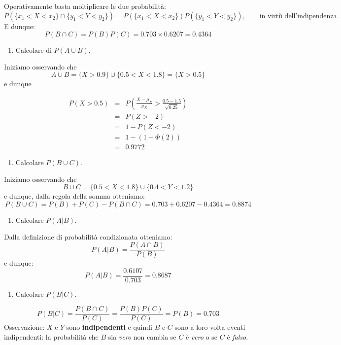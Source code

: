 \documentclass[
  11pt,
]{book}
\providecommand{\tightlist}{%
  \setlength{\itemsep}{0pt}\setlength{\parskip}{0pt}}
\theoremstyle{mytheoremstyle}
\theoremstyle{mydefstyle}
\begin{document}
Operativamente basta moltiplicare le due probabilità:
\[P(\{x_1<X<x_2\}\cap\{y_1<Y<y_2\})=P(\{x_1<X<x_2\})P(\{y_1<Y<y_2\}),\qquad \text{in virtù dell'indipendenza}\]
E dunque:
\[P(B\cap C)=P(B)P(C)=0.703\times0.6207=0.4364\]

\begin{enumerate}
\def\labelenumi{\arabic{enumi}.}
\setcounter{enumi}{7}
\tightlist
\item
  Calcolare di \(P(A\cup B)\).
\end{enumerate}

Iniziamo osservando che
\[A\cup B=\{X>0.9\}\cup\{0.5<X<1.8\}=\{X > 0.5\}\]
e dunque

\begin{eqnarray*}
      P( X   >   0.5 ) 
        &=& P\left(  \frac { X  -  \mu_X }{ \sigma_X }  >  \frac { 0.5  -  1.5 }{\sqrt{ 0.25 }} \right)  \\
                 &=& P\left(  Z   >   -2 \right) \\    &=& 1-P(Z< -2 )\\ 
                 &=&  1-(1-\Phi( 2 )) \\ &=&  0.9772 
      \end{eqnarray*}

\begin{enumerate}
\def\labelenumi{\arabic{enumi}.}
\setcounter{enumi}{8}
\tightlist
\item
  Calcolare \(P(B\cup C)\).
\end{enumerate}

Iniziamo osservando che
\[B\cup C=\{0.5<X<1.8\}\cup\{0.4<Y<1.2\}\]
e dunque, dalla regola della somma otteniamo:
\[P(B\cup C)=P(B)+P(C)-P(B\cap C)=0.703+0.6207-0.4364=0.8874\]

\begin{enumerate}
\def\labelenumi{\arabic{enumi}.}
\setcounter{enumi}{9}
\tightlist
\item
  Calcolare \(P(A|B)\).
\end{enumerate}

Dalla definizione di probabilità condizionata otteniamo:
\[P(A|B)=\frac{P(A\cap B)}{P(B)}\]
e dunque:
\[P(A|B)=\frac{0.6107}{0.703}=0.8687\]

\begin{enumerate}
\def\labelenumi{\arabic{enumi}.}
\setcounter{enumi}{10}
\tightlist
\item
  Calcolare \(P(B|C)\).
\end{enumerate}

\[P(B|C)=\frac{P(B\cap C)}{P(C)}=\frac{P(B)P(C)}{P(C)}=P(B)=0.703\]
Osservazione: \(X\) e \(Y\) sono \textbf{indipendenti} e quindi \(B\) e \(C\) sono a loro volta eventi indipendenti: la probabilità che \(B\) sia \emph{vero} non cambia se \(C\) è \emph{vero} o se \(C\) è \emph{falso}.
\end{document}
